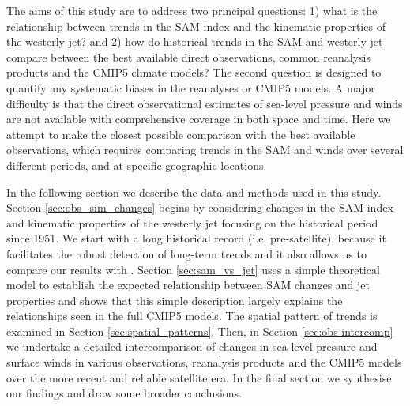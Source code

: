\documentclass{ametsoc}
\begin{document}
The aims of this study are to address two principal questions: 1) what is the relationship  between trends 
in the SAM index and the kinematic properties of the westerly jet? and 2) how do
historical trends in the SAM and westerly jet compare between the best available direct observations,
common reanalysis products and the CMIP5 climate models? The second question is designed to quantify 
any systematic biases in the reanalyses or CMIP5 models. A major difficulty is that the direct observational
estimates of sea-level pressure and winds are not available with comprehensive coverage in both space and time. 
Here we attempt to make the closest possible comparison with the best available observations, which requires
comparing trends in the SAM and winds over several different periods, and at specific geographic locations.

In the following section we describe the data and methods used in this study. Section \ref{sec:obs_sim_changes} 
begins  by considering changes in the SAM index and kinematic properties of the westerly jet 
focusing on the historical period since 1951. We start with a long historical record (i.e. pre-satellite),
because it facilitates the robust detection of long-term trends and it also allows us to compare our results with 
\cite{Gillett_and_Fyfe_2013}. Section \ref{sec:sam_vs_jet} uses a simple theoretical model to 
establish the expected relationship between SAM changes and jet properties and  shows that this simple 
description largely explains the relationships seen in the full CMIP5 models. The spatial pattern of trends
is examined in Section \ref{sec:spatial_patterns}. Then, in Section \ref{sec:obs-intercomp} we
undertake a detailed intercomparison of changes in sea-level pressure and surface winds in various observations,
reanalysis products and the CMIP5 models over the more recent and reliable satellite era. In the final section
we synthesise our findings and draw some broader conclusions.
\end{document}
